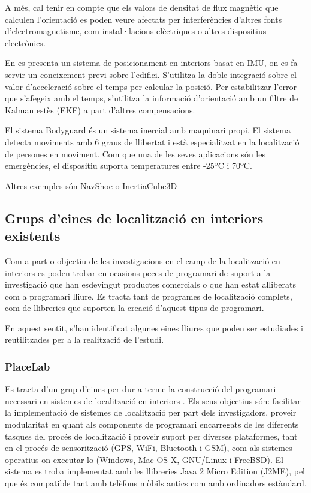 A més, cal tenir en compte que els valors de densitat de flux magnètic que calculen l'orientació es poden veure afectats per interferències d’altres fonts d’electromagnetisme, com instal·lacions elèctriques o altres dispositius electrònics.

En \cite{glancer} es presenta un sistema de posicionament en interiors basat en IMU, on es fa servir un coneixement previ sobre l’edifici. S’utilitza la doble integració sobre el valor d'acceleració sobre el temps per calcular la posició. Per estabilitzar l'error que s'afegeix amb el temps, s'utilitza la informació d'orientació amb un filtre de Kalman estès (EKF) a part d'altres compensacions.

El sistema Bodyguard \cite{koppe} és un sistema inercial amb maquinari propi. El sistema detecta moviments amb 6 graus de llibertat i està especialitzat en la localització de persones en moviment. Com que una de les seves aplicacions són les emergències, el dispositiu suporta temperatures entre -25ºC i 70ºC.

Altres exemples són NavShoe \cite{krach} o InertiaCube3D


\subsection{Grups d’eines de localització en interiors existents}

Com a part o objectiu de les investigacions en el camp de la localització en interiors es poden trobar en ocasions peces de programari de suport a la investigació que han esdevingut productes comercials o que han estat alliberats com a programari lliure. Es tracta tant de programes de localització complets, com de llibreries que suporten la creació d'aquest tipus de programari.

En aquest sentit, s'han identificat algunes eines lliures que poden ser estudiades i reutilitzades per a la realització de l'estudi.

\subsubsection{PlaceLab}

Es tracta d’un grup d’eines per dur a terme la construcció del programari necessari en sistemes de localització en interiors \cite{sohn}. Els seus objectius són: facilitar la implementació de sistemes de localització per part dels investigadors, proveir modularitat en quant als components de programari encarregats de les diferents tasques del procés de localització i proveir suport per diverses plataformes, tant en el procés de sensorització (GPS, WiFi, Bluetooth i GSM), com als sistemes operatius on executar-lo (Windows, Mac OS X, GNU/Linux i FreeBSD). El sistema es troba implementat amb les llibreries Java 2 Micro Edition (J2ME), pel que és compatible tant amb telèfons mòbils antics com amb ordinadors estàndard.

